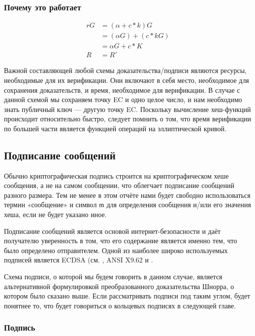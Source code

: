 \subsubsection*{Почему это работает}

\begin{align*}
r G &= (\alpha + c*k) G \\
	&= (\alpha G) + (c*k G) \\
	&= \alpha G + c*K \\
  R &= R'
\end{align*}

Важной составляющей любой схемы доказательства/подписи являются ресурсы, необходимые для их верификации. Они включают в себя место, необходимое для сохранения доказательств, и время, необходимое для верификации. В случае с данной схемой мы сохраняем точку EC и одно целое число, и нам необходимо знать публичный ключ — другую точку EC. Поскольку вычисление хеш-функций происходит относительно быстро, следует помнить о том, что время верификации по большей части является функцией операций на эллиптической кривой.


\subsection{Подписание сообщений}
\label{sec:signing-messages}

Обычно криптографическая подпись строится на криптографическом хеше сообщения, а не на самом сообщении, что облегчает подписание сообщений разного размера. Тем не менее в этом отчёте нами будет свободно использоваться термин «сообщение» и символ $\mathfrak{m}$ для определения сообщения и/или его значения хеша, если не будет указано иное.

Подписание сообщений является основой интернет-безопасности и даёт получателю уверен\-ность в том, что его содержание является именно тем, что было определено отправителем. Одной из наиболее широко используемых подписей является ECDSA (см. \cite{ecdsa}, ANSI X9.62 и \cite{Hankerson:2003:GEC:940321}.

Схема подписи, о которой мы будем говорить в данном случае, является альтернативной формулировкой преобразованного доказательства Шнорра, о котором было сказано выше. Если рассматривать подписи под таким углом, будет понятнее то, что будет говориться о кольцевых подписях в следующей главе.

\subsubsection*{Подпись}

